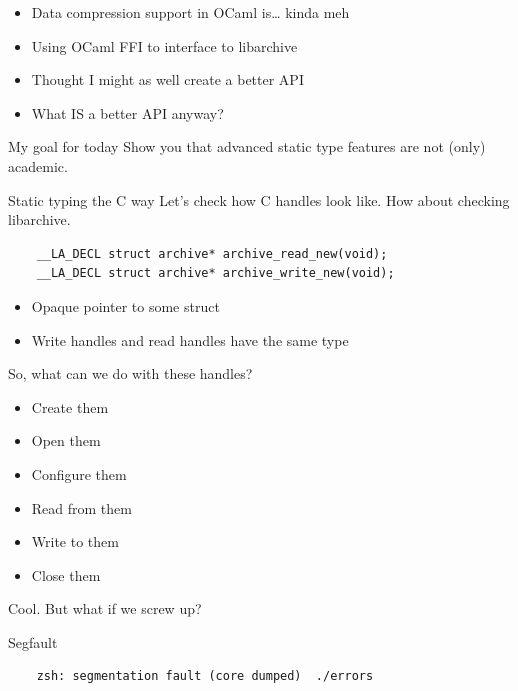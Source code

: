 \documentclass{beamer}
\begin{document}
\begin{frame}
  \begin{itemize}
    \item Data compression support in OCaml is… kinda meh
    \item Using OCaml FFI to interface to libarchive
    \item Thought I might as well create a better API
    \item What IS a better API anyway?
  \end{itemize}
  \pause
  \begin{exampleblock}{My goal for today}
    Show you that advanced static type features are not (only) academic.
  \end{exampleblock}
\end{frame}

\begin{frame}[fragile]{Static typing the C way}
  Let's check how C handles look like. How about checking libarchive.
  \begin{verbatim}
    __LA_DECL struct archive* archive_read_new(void);
    __LA_DECL struct archive* archive_write_new(void);
  \end{verbatim}
  \begin{itemize}
    \item Opaque pointer to some struct
    \item Write handles and read handles have the same type
  \end{itemize}
\end{frame}

\begin{frame}
  So, what can we do with these handles?
  \pause
  \begin{itemize}
    \item Create them
    \item Open them
    \item Configure them
    \item Read from them
    \item Write to them
    \item Close them
  \end{itemize}
  \pause
  Cool.
  \pause
  \alert{But what if we screw up?}
\end{frame}

\begin{frame}[fragile]{Segfault}
  \begin{verbatim}
    zsh: segmentation fault (core dumped)  ./errors
  \end{verbatim}
\end{frame}
\end{document}
